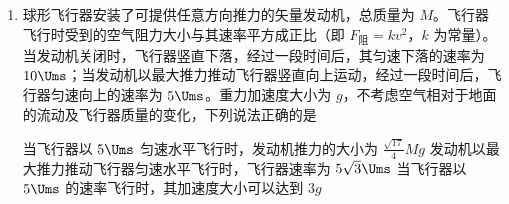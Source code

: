 \documentclass[\gkver]{gaokaozhenti}
\begin{document}
\begin{enumerate}

{在冲日处，地球上的观测者观测到火星的运动为顺行}
{在冲日处，地球上的观测者观测到火星的运动为逆行}
{在冲日处，火星相对于地球的速度最小}


\item
球形飞行器安装了可提供任意方向推力的矢量发动机，总质量为 $M$。飞行器飞行时受到的空气阻力大小与其速率平方成正比（即 $F_{\text{阻}} = kv^{2}$，$k$ 为常量）。当发动机关闭时，飞行器竖直下落，经过一段时间后，其匀速下落的速率为 $10\Ums$；当发动机以最大推力推动飞行器竖直向上运动，经过一段时间后，飞行器匀速向上的速率为 $5\Ums$。重力加速度大小为 $g$，不考虑空气相对于地面的流动及飞行器质量的变化，下列说法正确的是

{当飞行器以 $5\Ums$ 匀速水平飞行时，发动机推力的大小为 $\frac{\sqrt{17}}{4}Mg$}
{发动机以最大推力推动飞行器匀速水平飞行时，飞行器速率为 $5\sqrt{3}\Ums$}
{当飞行器以 $5\Ums$ 的速率飞行时，其加速度大小可以达到 $3g$}

\end{enumerate}
\end{document}

